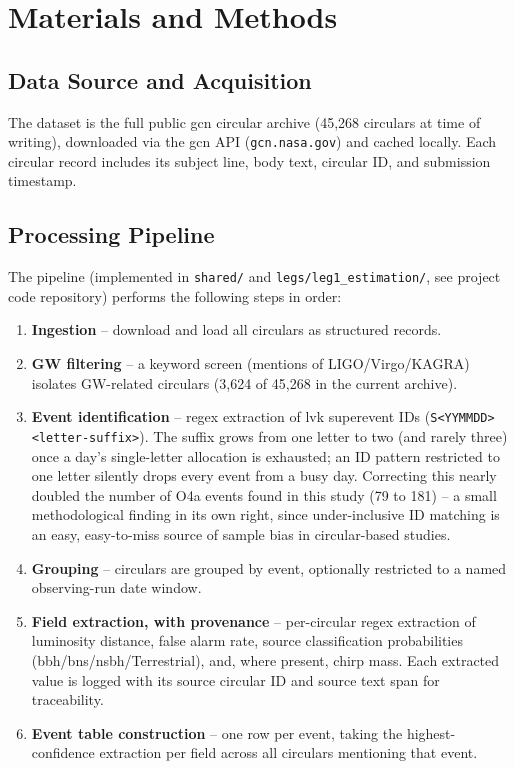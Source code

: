 \chapter{Materials and Methods}
\label{ch:methods}

\section{Data Source and Acquisition}

The dataset is the full public \gls{gcn} circular archive (45{,}268 circulars at time of writing), downloaded via the \gls{gcn} API (\texttt{gcn.nasa.gov}) and cached locally. Each circular record includes its subject line, body text, circular ID, and submission timestamp.

\section{Processing Pipeline}

The pipeline (implemented in \texttt{shared/} and \texttt{legs/leg1\_estimation/}, see project code repository) performs the following steps in order:

\begin{enumerate}
    \item \textbf{Ingestion} -- download and load all circulars as structured records.
    \item \textbf{GW filtering} -- a keyword screen (mentions of LIGO/Virgo/KAGRA) isolates GW-related circulars (3{,}624 of 45{,}268 in the current archive).
    \item \textbf{Event identification} -- regex extraction of \gls{lvk} superevent IDs (\texttt{S\textless YYMMDD\textgreater\textless letter-suffix\textgreater}). The suffix grows from one letter to two (and rarely three) once a day's single-letter allocation is exhausted; an ID pattern restricted to one letter silently drops every event from a busy day. Correcting this nearly doubled the number of O4a events found in this study (79 to 181) -- a small methodological finding in its own right, since under-inclusive ID matching is an easy, easy-to-miss source of sample bias in circular-based studies.
    \item \textbf{Grouping} -- circulars are grouped by event, optionally restricted to a named observing-run date window.
    \item \textbf{Field extraction, with provenance} -- per-circular regex extraction of luminosity distance, false alarm rate, source classification probabilities (\gls{bbh}/\gls{bns}/\gls{nsbh}/Terrestrial), and, where present, chirp mass. Each extracted value is logged with its source circular ID and source text span for traceability.
    \item \textbf{Event table construction} -- one row per event, taking the highest-confidence extraction per field across all circulars mentioning that event.
\end{enumerate}

